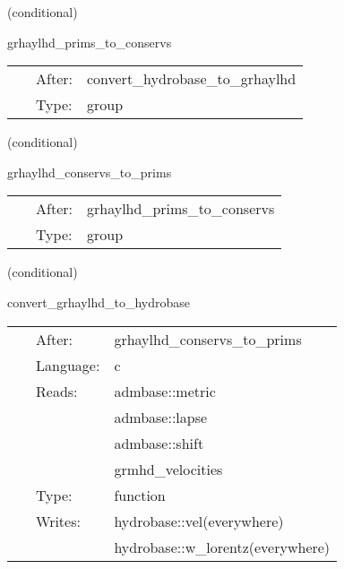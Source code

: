 \documentclass{article}
\begin{document}
\vspace{5mm}

   (conditional) 

\hspace{5mm} grhaylhd\_prims\_to\_conservs 

\hspace{5mm}{\it compute conservative variables from primitives } 


\hspace{5mm}

 \begin{tabular*}{160mm}{cll} 
~ & After:  & convert\_hydrobase\_to\_grhaylhd \\ 
~ & Type:  & group \\ 
\end{tabular*} 


\vspace{5mm}

   (conditional) 

\hspace{5mm} grhaylhd\_conservs\_to\_prims 

\hspace{5mm}{\it compute primitive variables from conservatives } 


\hspace{5mm}

 \begin{tabular*}{160mm}{cll} 
~ & After:  & grhaylhd\_prims\_to\_conservs \\ 
~ & Type:  & group \\ 
\end{tabular*} 


\vspace{5mm}

   (conditional) 

\hspace{5mm} convert\_grhaylhd\_to\_hydrobase 

\hspace{5mm}{\it convert grhaylhd-native variables to hydrobase } 


\hspace{5mm}

 \begin{tabular*}{160mm}{cll} 
~ & After:  & grhaylhd\_conservs\_to\_prims \\ 
~ & Language:  & c \\ 
~ & Reads:  & admbase::metric \\ 
~& ~ &admbase::lapse\\ 
~& ~ &admbase::shift\\ 
~& ~ &grmhd\_velocities\\ 
~ & Type:  & function \\ 
~ & Writes:  & hydrobase::vel(everywhere) \\ 
~& ~ &hydrobase::w\_lorentz(everywhere)\\ 
\end{tabular*} 
\end{document}
